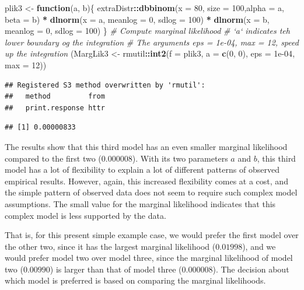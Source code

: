 \documentclass[12pt,]{krantz}
\newenvironment{Shaded}{\begin{snugshade}}{\end{snugshade}}
\newcommand{\KeywordTok}[1]{\textcolor[rgb]{0.13,0.29,0.53}{\textbf{#1}}}
\newcommand{\DataTypeTok}[1]{\textcolor[rgb]{0.13,0.29,0.53}{#1}}
\newcommand{\DecValTok}[1]{\textcolor[rgb]{0.00,0.00,0.81}{#1}}
\newcommand{\FloatTok}[1]{\textcolor[rgb]{0.00,0.00,0.81}{#1}}
\newcommand{\StringTok}[1]{\textcolor[rgb]{0.31,0.60,0.02}{#1}}
\newcommand{\CommentTok}[1]{\textcolor[rgb]{0.56,0.35,0.01}{\textit{#1}}}
\newcommand{\ControlFlowTok}[1]{\textcolor[rgb]{0.13,0.29,0.53}{\textbf{#1}}}
\newcommand{\OperatorTok}[1]{\textcolor[rgb]{0.81,0.36,0.00}{\textbf{#1}}}
\newcommand{\NormalTok}[1]{#1}
\theoremstyle{definition}
\theoremstyle{definition}
\theoremstyle{definition}
\theoremstyle{remark}
\begin{document}
\begin{Shaded}
\begin{Highlighting}[]
\NormalTok{plik3 <-}\StringTok{ }\ControlFlowTok{function}\NormalTok{(a, b)\{}
\NormalTok{  extraDistr}\OperatorTok{::}\KeywordTok{dbbinom}\NormalTok{(}\DataTypeTok{x =} \DecValTok{80}\NormalTok{, }\DataTypeTok{size =} \DecValTok{100}\NormalTok{,}\DataTypeTok{alpha =}\NormalTok{ a, }\DataTypeTok{beta =}\NormalTok{ b) }\OperatorTok{*}
\StringTok{    }\KeywordTok{dlnorm}\NormalTok{(}\DataTypeTok{x =}\NormalTok{ a, }\DataTypeTok{meanlog =} \DecValTok{0}\NormalTok{, }\DataTypeTok{sdlog =} \DecValTok{100}\NormalTok{) }\OperatorTok{*}
\StringTok{    }\KeywordTok{dlnorm}\NormalTok{(}\DataTypeTok{x =}\NormalTok{ b, }\DataTypeTok{meanlog =} \DecValTok{0}\NormalTok{, }\DataTypeTok{sdlog =} \DecValTok{100}\NormalTok{)}
\NormalTok{\}}
\CommentTok{# Compute marginal likelihood}
\CommentTok{# `a` indicates teh lower boundary og the integration}
\CommentTok{# The arguments eps = 1e-04, max = 12, speed up the integration}
\NormalTok{(MargLik3 <-}\StringTok{ }\NormalTok{rmutil}\OperatorTok{::}\KeywordTok{int2}\NormalTok{(}\DataTypeTok{f =}\NormalTok{ plik3, }\DataTypeTok{a =} \KeywordTok{c}\NormalTok{(}\DecValTok{0}\NormalTok{, }\DecValTok{0}\NormalTok{), }\DataTypeTok{eps =} \FloatTok{1e-04}\NormalTok{, }\DataTypeTok{max =} \DecValTok{12}\NormalTok{))}
\end{Highlighting}
\end{Shaded}

\begin{verbatim}
## Registered S3 method overwritten by 'rmutil':
##   method         from
##   print.response httr
\end{verbatim}

\begin{verbatim}
## [1] 0.00000833
\end{verbatim}

The results show that this third model has an even smaller marginal
likelihood compared to the first two (\(0.000008\)). With its two
parameters \(a\) and \(b\), this third model has a lot of flexibility to
explain a lot of different patterns of observed empirical results.
However, again, this increased flexibility comes at a cost, and the
simple pattern of observed data does not seem to require such complex
model assumptions. The small value for the marginal likelihood indicates
that this complex model is less supported by the data.

That is, for this present simple example case, we would prefer the first
model over the other two, since it has the largest marginal likelihood
(\(0.01998\)), and we would prefer model two over model three, since the
marginal likelihood of model two (\(0.00990\)) is larger than that of
model three (\(0.000008\)). The decision about which model is preferred
is based on comparing the marginal likelihoods.
\end{document}
